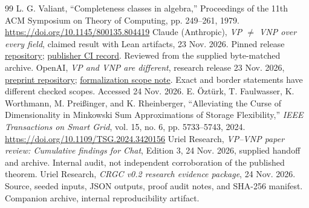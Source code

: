 \documentclass[11pt,letterpaper]{article}
\begin{document}
\begin{thebibliography}{99}
 L. G. Valiant, ``Completeness classes in algebra,'' Proceedings of the 11th ACM Symposium on Theory of Computing, pp. 249--261, 1979. \url{https://doi.org/10.1145/800135.804419}
 Claude (Anthropic), \emph{VP $\ne$ VNP over every field}, claimed result with Lean artifacts, 23 Nov. 2026. Pinned release \href{https://github.com/anthropics/formal-math/tree/11b6c7e3c927df2658f513b6b68ea7f8929c62c5/vp-vnp}{repository}; \href{https://github.com/anthropics/formal-math/actions/runs/45272623486/job/138036167794}{publisher CI record}. Reviewed from the supplied byte-matched archive.
 OpenAI, \emph{VP and VNP are different}, research release 23 Nov. 2026, \href{https://github.com/openai/math/tree/main/preprints/VP-and-VNP-are-different-November-23-2026}{preprint repository}; \href{https://github.com/openai/math/blob/main/lean/docs/379.md}{formalization scope note}. Exact and border statements have different checked scopes. Accessed 24 Nov. 2026.
 E. \"Ozt\"urk, T. Faulwasser, K. Worthmann, M. Prei\ss inger, and K. Rheinberger, ``Alleviating the Curse of Dimensionality in Minkowski Sum Approximations of Storage Flexibility,'' \emph{IEEE Transactions on Smart Grid}, vol. 15, no. 6, pp. 5733--5743, 2024. \url{https://doi.org/10.1109/TSG.2024.3420156}
 Uriel Research, \emph{VP--VNP paper review: Cumulative findings for Chat}, Edition 3, 24 Nov. 2026, supplied handoff and archive. Internal audit, not independent corroboration of the published theorem.
 Uriel Research, \emph{CRGC v0.2 research evidence package}, 24 Nov. 2026. Source, seeded inputs, JSON outputs, proof audit notes, and SHA-256 manifest. Companion archive, internal reproducibility artifact.

\end{thebibliography}
\end{document}

